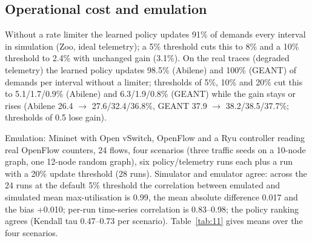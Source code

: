 \documentclass[journal]{IEEEtran}
\begin{document}
\subsection{Operational cost and emulation}
\label{sec:6.6}
Without a rate limiter the learned policy updates 91\% of demands every interval in simulation (Zoo, ideal telemetry); a 5\% threshold cuts this to 8\% and a 10\% threshold to 2.4\% with unchanged gain (3.1\%). On the real traces (degraded telemetry) the learned policy updates 98.5\% (Abilene) and 100\% (GEANT) of demands per interval without a limiter; thresholds of 5\%, 10\% and 20\% cut this to 5.1/1.7/0.9\% (Abilene) and 6.3/1.9/0.8\% (GEANT) while the gain stays or rises (Abilene 26.4 $\rightarrow$ 27.6/32.4/36.8\%, GEANT 37.9 $\rightarrow$ 38.2/38.5/37.7\%; thresholds of 0.5 lose gain).

Emulation: Mininet \cite{r26} with Open vSwitch, OpenFlow \cite{r27} and a Ryu controller reading real OpenFlow counters, 24 flows, four scenarios (three traffic seeds on a 10-node graph, one 12-node random graph), six policy/telemetry runs each plus a run with a 20\% update threshold (28 runs). Simulator and emulator agree: across the 24 runs at the default 5\% threshold the correlation between emulated and simulated mean max-utilisation is 0.99, the mean absolute difference 0.017 and the bias +0.010; per-run time-series correlation is 0.83--0.98; the policy ranking agrees (Kendall tau 0.47--0.73 per scenario). Table~\ref{tab:11} gives means over the four scenarios.

\begin{table}[!t]
\caption{Emulation results, means over four scenarios: emulated max-utilisation, flow-mods per minute and controller loop time.}
\label{tab:11}
\centering
\footnotesize
\renewcommand{\arraystretch}{1.05}
\end{table}
\end{document}
